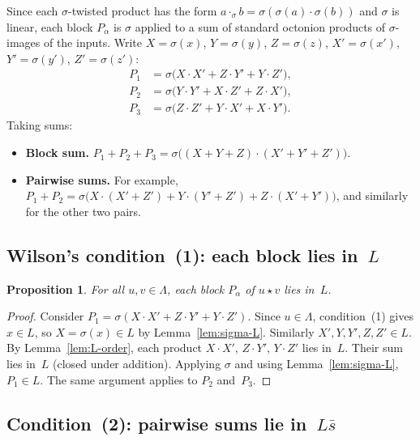 \documentclass[twoside,english]{paper}
\numberwithin{equation}{section}
\numberwithin{figure}{section}
\newtheorem{proposition}[theorem]{Proposition}
\theoremstyle{definition}
\theoremstyle{remark}
\newcommand{\LL}{\Lambda}             %
\begin{document}
Since each $\sigma$-twisted product has the form
$a \cdot_\sigma b = \sigma(\sigma(a) \cdot \sigma(b))$ and $\sigma$
is linear, each block $P_\alpha$ is $\sigma$ applied to a sum of
standard octonion products of $\sigma$-images of the inputs.
Write $X = \sigma(x)$, $Y = \sigma(y)$, $Z = \sigma(z)$,
$X' = \sigma(x')$, $Y' = \sigma(y')$, $Z' = \sigma(z')$:
\begin{align}
  P_1 &= \sigma\bigl(X \cdot X' + Z \cdot Y' + Y \cdot Z'\bigr),
  \label{eq:P1-std} \\
  P_2 &= \sigma\bigl(Y \cdot Y' + X \cdot Z' + Z \cdot X'\bigr),
  \label{eq:P2-std} \\
  P_3 &= \sigma\bigl(Z \cdot Z' + Y \cdot X' + X \cdot Y'\bigr).
  \label{eq:P3-std}
\end{align}
Taking sums:
\begin{itemize}
\item \textbf{Block sum.}
  $P_1 + P_2 + P_3 = \sigma\bigl((X+Y+Z) \cdot (X'+Y'+Z')\bigr)$.
\item \textbf{Pairwise sums.}  For example,
  $P_1 + P_2 = \sigma\bigl(X \cdot (X'+Z') + Y \cdot (Y'+Z') +
  Z \cdot (X'+Y')\bigr)$, and similarly for the other two pairs.
\end{itemize}

\subsection{Wilson's condition~(1): each block lies in~$L$}

\begin{proposition}\label{prop:cond1}
For all $u, v \in \LL$, each block $P_\alpha$ of $u \star v$ lies
in~$L$.
\end{proposition}

\begin{proof}
Consider $P_1 = \sigma(X \cdot X' + Z \cdot Y' + Y \cdot Z')$.
Since $u \in \LL$, condition~(1) gives $x \in L$, so
$X = \sigma(x) \in L$ by Lemma~\ref{lem:sigma-L}.  Similarly
$X', Y, Y', Z, Z' \in L$.
By Lemma~\ref{lem:L-order}, each product $X \cdot X'$, $Z \cdot Y'$,
$Y \cdot Z'$ lies in~$L$.  Their sum lies in~$L$ (closed under
addition).  Applying $\sigma$ and using Lemma~\ref{lem:sigma-L},
$P_1 \in L$.  The same argument applies to
$P_2$ and~$P_3$.
\end{proof}

\subsection{Condition~(2): pairwise sums lie in~$L\bar{s}$}
\end{document}

